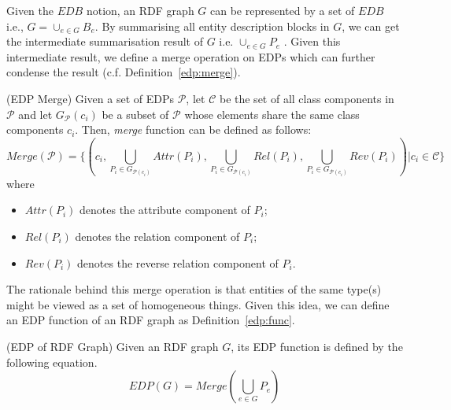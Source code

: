 Given the $EDB$ notion, an RDF graph $G$ can be represented by a set of $EDB$ i.e., $G=\cup_{e \in G}{B_e}$. By summarising all entity description blocks in $G$, we can get the intermediate summarisation result of $G$ i.e. $\cup_{e \in G}{P_e}$ . Given this intermediate result, we define a merge operation on EDPs which can further condense the result (c.f. Definition~\ref{edp:merge}).
\vspace{-1ex}
\begin{definition} 
\label{edp:merge}
(EDP Merge)  Given a set of EDPs $\mathcal{P}$, let $\mathcal{C}$ be the set of all class components in $\mathcal{P}$ and let $G_{\mathcal{P}}(c_i)$ be a subset of $\mathcal{P}$ whose elements share the same class components $c_i$. Then, \emph{merge} function can be defined as follows:
\scriptsize
\begin{equation}
Merge(\mathcal{P})=\{(c_i, \bigcup_{P_i \in G_{\mathcal{P}(c_i)}}{Attr(P_i)}, \bigcup_{P_i \in G_{\mathcal{P}(c_i)}}{Rel(P_i)}, \bigcup_{P_i \in G_{\mathcal{P}(c_i)}}{Rev(P_i)}) | c_i \in \mathcal{C} \}
\end{equation}
\normalsize
where
\begin{itemize}
\item $Attr(P_i)$ denotes the attribute component of $P_i$;
\item $Rel(P_i)$ denotes the relation component of $P_i$;
\item $Rev(P_i)$ denotes the reverse relation component of $P_i$.
\end{itemize}
\end{definition}

The rationale behind this merge operation is that entities of the same type(s) might be viewed as a set of homogeneous things. Given this idea, we can define an EDP function of an RDF graph as Definition~\ref{edp:func}.
\vspace{-1ex}
\begin{definition} 
\label{edp:func}
(EDP of RDF Graph) Given an RDF graph $G$, its EDP function is defined by the following equation.
\begin{equation}
EDP(G)=Merge(\bigcup_{e \in G}{P_e})
\end{equation}
\end{definition}

